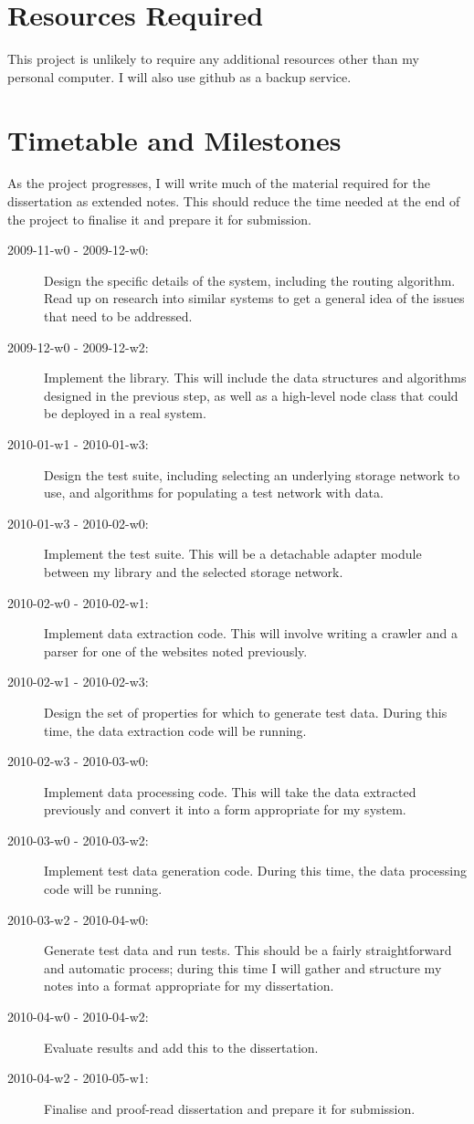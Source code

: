 \documentclass[12pt]{article}
\begin{document}
\section*{Resources Required}

This project is unlikely to require any additional resources other than my
personal computer. I will also use github as a backup service.


\section*{Timetable and Milestones}

As the project progresses, I will write much of the material required for the
dissertation as extended notes. This should reduce the time needed at the end
of the project to finalise it and prepare it for submission.

\begin{description}
\item [2009-11-w0 - 2009-12-w0:] Design the specific details of the system,
    including the routing algorithm. Read up on research into similar systems
    to get a general idea of the issues that need to be addressed.
\item [2009-12-w0 - 2009-12-w2:] Implement the library. This will include the
    data structures and algorithms designed in the previous step, as well as a
    high-level node class that could be deployed in a real system.
\item [2010-01-w1 - 2010-01-w3:] Design the test suite, including selecting an
    underlying storage network to use, and algorithms for populating a test
    network with data.
\item [2010-01-w3 - 2010-02-w0:] Implement the test suite. This will be a
    detachable adapter module between my library and the selected storage
    network.
\item [2010-02-w0 - 2010-02-w1:] Implement data extraction code. This will
    involve writing a crawler and a parser for one of the websites noted
    previously.
\item [2010-02-w1 - 2010-02-w3:] Design the set of properties for which to
    generate test data. During this time, the data extraction code will be
    running.
\item [2010-02-w3 - 2010-03-w0:] Implement data processing code. This will take
    the data extracted previously and convert it into a form appropriate for my
    system.
\item [2010-03-w0 - 2010-03-w2:] Implement test data generation code. During
    this time, the data processing code will be running.
\item [2010-03-w2 - 2010-04-w0:] Generate test data and run tests. This should
    be a fairly straightforward and automatic process; during this time I will
    gather and structure my notes into a format appropriate for my
    dissertation.
\item [2010-04-w0 - 2010-04-w2:] Evaluate results and add this to the
    dissertation.
\item [2010-04-w2 - 2010-05-w1:] Finalise and proof-read dissertation and
    prepare it for submission.
\end{description}
\end{document}
